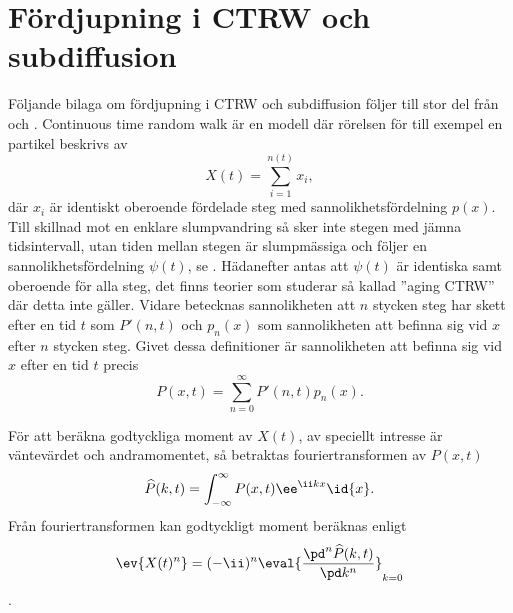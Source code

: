 \newcommand{\Pk}{\widehat{P}}
\newcommand{\Pks}{\widetilde{\widehat{P}}}
\newcommand{\pk}{\hat{p}}
\newcommand{\PPs}{\widetilde{P'}}
\newcommand{\psis}{\widetilde{\psi}}
\newcommand{\PSIs}{\widetilde{\Psi}}


\chapter{Fördjupning i CTRW och subdiffusion}


\label{app:CTRW} 
Följande bilaga om fördjupning i CTRW och subdiffusion  följer till stor del från \cite{Chu_2003} och \cite{Vahey_2006}. Continuous time random walk är en modell där rörelsen för till exempel en partikel beskrivs av 
\begin{equation}
    X(t) = \sum_{i=1}^{n(t)} x_i,
\end{equation}
där $x_i$ är identiskt oberoende fördelade steg med sannolikhetsfördelning $p(x)$. Till skillnad mot en enklare slumpvandring så sker inte stegen med jämna tidsintervall, utan tiden mellan stegen är slumpmässiga och följer en sannolikhetsfördelning $\psi (t)$, se . Hädanefter antas att $\psi(t)$ är identiska samt oberoende för alla steg, det finns teorier som studerar så kallad ''aging CTRW''\cite{Barkai_ACTRW2002} där detta inte gäller. Vidare betecknas sannolikheten att $n$ stycken steg har skett efter en tid $t$ som $P'(n,t)$ och $p_n(x)$ som sannolikheten att befinna sig vid $x$ efter $n$ stycken steg. Givet dessa definitioner är sannolikheten att befinna sig vid $x$ efter en tid $t$ precis 
\begin{equation}
\label{eq:P(x,t)}
    P(x,t) =\sum_{n=0}^{\infty} P'(n,t)p_n(x).
\end{equation}

För att beräkna godtyckliga moment av $X(t)$, av speciellt intresse är väntevärdet och andramomentet, så betraktas fouriertransformen av $P(x,t)$
\begin{equation}\label{eq:four}
\Pk (k,t) = \int_{-\infty}^{\infty} P(x,t)\ee^{\ii kx}\id{x}.
\end{equation}
Från fouriertransformen kan godtyckligt moment beräknas enligt 
\begin{equation}\label{eq:moment}
\ev{X(t)^n} = (-\ii)^n \eval{\frac{\pd^n \Pk (k,t)}{\pd k^n}}_{k=0}
\end{equation}. 

